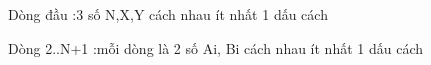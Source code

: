 Dòng đầu :3 số N,X,Y cách nhau ít nhất 1 dấu cách  

   Dòng 2..N+1 :mỗi dòng là 2 số Ai, Bi cách nhau ít nhất 1 dấu cách